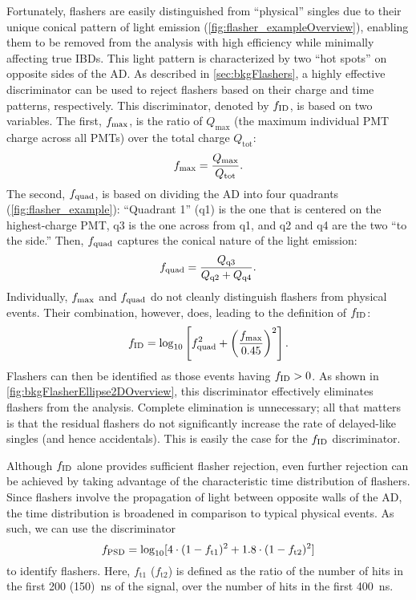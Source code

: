 \documentclass[../thesis.tex]{subfiles}
\begin{document}
Fortunately, flashers are easily distinguished from ``physical'' singles due to their unique conical pattern of light emission (\autoref{fig:flasher_exampleOverview}), enabling them to be removed from the analysis with high efficiency while minimally affecting true IBDs. This light pattern is characterized by two ``hot spots'' on opposite sides of the AD. As described in \autoref{sec:bkgFlashers}, a highly effective discriminator can be used to reject flashers based on their charge and time patterns, respectively. This discriminator, denoted by $f_{\mathrm{ID}}$, is based on two variables. The first, $f_{\mathrm{max}}$, is the ratio of $Q_{\mathrm{max}}$ (the maximum individual PMT charge across all PMTs) over the total charge $Q_{\mathrm{tot}}$:
\begin{equation}
  f_{\mathrm{max}} = \frac{Q_{\mathrm{max}}}{Q_{\mathrm{tot}}}.
\end{equation}
The second, $f_{\mathrm{quad}}$, is based on dividing the AD into four quadrants (\autoref{fig:flasher_example}): ``Quadrant 1'' (q1) is the one that is centered on the highest-charge PMT, q3 is the one across from q1, and q2 and q4 are the two ``to the side.'' Then, $f_{\mathrm{quad}}$ captures the conical nature of the light emission:
\begin{equation}
  f_{\mathrm{quad}} = \frac{Q_{\mathrm{q3}}}{Q_{\mathrm{q2}} + Q_{\mathrm{q4}}}.
\end{equation}
Individually, $f_{\mathrm{max}}$ and $f_{\mathrm{quad}}$ do not cleanly distinguish flashers from physical events. Their combination, however, does, leading to the definition of $f_{\mathrm{ID}}$:
\begin{equation}
  f_{\mathrm{ID}} = \log_{10} \left[ f_{\mathrm{quad}}^2 + \left( \frac{f_{\mathrm{max}}}{0.45} \right)^2 \right].
\end{equation}
Flashers can then be identified as those events having $f_{\mathrm{ID}} > 0$. As shown in \autoref{fig:bkgFlasherEllipse2DOverview}, this discriminator effectively eliminates flashers from the analysis. Complete elimination is unnecessary; all that matters is that the residual flashers do not significantly increase the rate of delayed-like singles (and hence accidentals). This is easily the case for the $f_{\mathrm{ID}}$ discriminator.

Although $f_{\mathrm{ID}}$ alone provides sufficient flasher rejection, even further rejection can be achieved by taking advantage of the characteristic time distribution of flashers. Since flashers involve the propagation of light between opposite walls of the AD, the time distribution is broadened in comparison to typical physical events. As such, we can use the discriminator
\begin{equation}
  f_{\mathrm{PSD}} = \log_{10} [4 \cdot (1 - f_{\mathrm{t}1})^2 + 1.8 \cdot (1 - f_{\mathrm{t}2})^2]
\end{equation}
to identify flashers. Here, $f_{\mathrm{t}1}$ ($f_{\mathrm{t}2}$) is defined as the ratio of the number of hits in the first 200 (150)~ns of the signal, over the number of hits in the first 400~ns.
\end{document}
